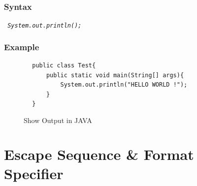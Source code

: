 \documentclass[A4 paper,openany]{book}  %
\begin{document}
\subsection{Syntax}
\begin{center}
    \tt{
        \textit{System.out.println();}
    }
\end{center}
% 
% 
\subsection{Example}
\begin{center}
    \begin{verbatim}
        public class Test{
            public static void main(String[] args){
                System.out.println("HELLO WORLD !");
            }
        }
    \end{verbatim}
\end{center}
% 
% 
\begin{figure}[htbp]
    \begin{center}
        \caption{Show Output in JAVA\cite{Ref3}}
    \end{center}
\end{figure}

% 
% 
\chapter{Escape Sequence \& Format Specifier}
% 
%
\end{document}
